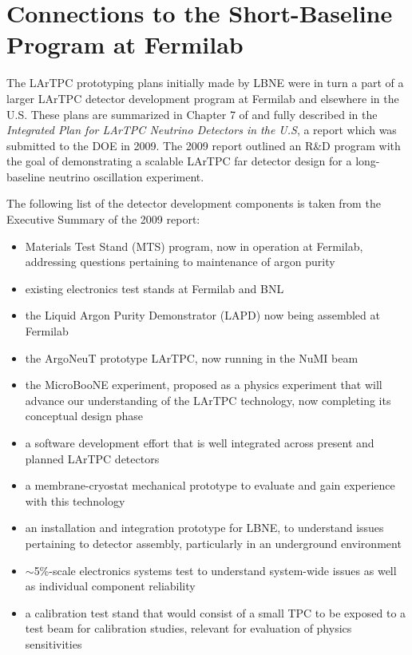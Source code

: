 \section{Connections to the Short-Baseline Program at Fermilab}
\label{sec:sbn_connect}

The LArTPC prototyping plans initially made by LBNE were in turn a part of a larger LArTPC detector development program at Fermilab and elsewhere in the U.S.  These plans are summarized in Chapter 7 of \anxlbnefd and fully described in the \textit{Integrated Plan for LArTPC Neutrino Detectors in the U.S}, a report which was submitted to the DOE in 2009.  
The 2009 report outlined an R\&D program with the goal of demonstrating a scalable LArTPC far detector design for a long-baseline neutrino oscillation experiment.  

The following list of the detector development components is taken from the Executive Summary of the 2009 report:
\begin{itemize}
   \item Materials Test Stand (MTS) program, now in operation at Fermilab, addressing questions pertaining to maintenance of argon purity
    \item existing electronics test stands at Fermilab and BNL
    \item the Liquid Argon Purity Demonstrator (LAPD) now being assembled at Fermilab
    \item the ArgoNeuT prototype LArTPC, now running in the NuMI beam
    \item the MicroBooNE experiment, proposed as a physics experiment that will advance our understanding of the LArTPC technology, now completing its conceptual design phase
    \item a software development effort that is well integrated across present and planned LArTPC detectors
    \item a membrane-cryostat mechanical prototype to evaluate and gain experience with this technology
    \item an installation and integration prototype for LBNE, to understand issues pertaining to detector assembly, particularly in an underground environment
    \item  $\sim$5\%-scale electronics systems test to understand system-wide issues as well as individual component reliability
    \item a calibration test stand that would consist of a small TPC to be exposed to a test beam for calibration studies, relevant for evaluation of physics sensitivities   
\end{itemize}

